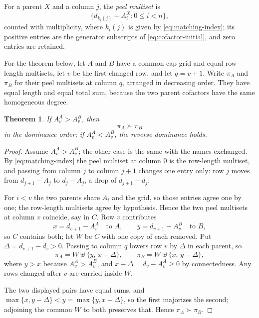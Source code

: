 \documentclass[11pt,a4paper]{amsart}
\numberwithin{equation}{section}
\theoremstyle{plain}
\newtheorem{theorem}{Theorem}[section]
\theoremstyle{definition}
\begin{document}
For a parent \(X\) and a column \(j\), the \emph{peel multiset} is
\[
\bigl\{d_{k_i(j)}-A_i^X:0\le i<n\bigr\},
\]
counted with multiplicity, where \(k_i(j)\) is given by \eqref{eq:matching-index}; its positive entries are the generator subscripts of \eqref{eq:cofactor-initial}, and zero entries are retained.

For the theorem below, let \(A\) and \(B\) have a common cap grid and equal row-length multisets, let \(v\) be the first changed row, and let \(q=v+1\).  Write \(\pi_A\) and \(\pi_B\) for their peel multisets at column \(q\), arranged in decreasing order.  They have equal length and equal total sum, because the two parent cofactors have the same homogeneous degree.

\begin{theorem}\label{thm:first-split-majorization}
If \(A_v^A>A_v^B\), then
\[
\pi_A\succ\pi_B
\]
in the dominance order; if \(A_v^A<A_v^B\), the reverse dominance holds.
\end{theorem}

\begin{proof}
Assume \(A_v^A>A_v^B\); the other case is the same with the names exchanged.  By \eqref{eq:matching-index} the peel multiset at column \(0\) is the row-length multiset, and passing from column \(j\) to column \(j+1\) changes one entry only: row \(j\) moves from \(d_{j+1}-A_j\) to \(d_j-A_j\), a drop of \(d_{j+1}-d_j\).

For \(i<v\) the two parents share \(A_i\) and the grid, so those entries agree one by one; the row-length multisets agree by hypothesis.  Hence the two peel multisets at column \(v\) coincide, say in \(C\).  Row \(v\) contributes
\[
x=d_{v+1}-A_v^A
\quad\text{to \(A\)},
\qquad
y=d_{v+1}-A_v^B
\quad\text{to \(B\)},
\]
so \(C\) contains both; let \(W\) be \(C\) with one copy of each removed.  Put \(\Delta=d_{v+1}-d_v>0\).  Passing to column \(q\) lowers row \(v\) by \(\Delta\) in each parent, so
\[
\pi_A=W\uplus\{y,\,x-\Delta\},
\qquad
\pi_B=W\uplus\{x,\,y-\Delta\},
\]
where \(y>x\) because \(A_v^A>A_v^B\), and \(x-\Delta=d_v-A_v^A\ge0\) by connectedness.  Any rows changed after \(v\) are carried inside \(W\).

The two displayed pairs have equal sums, and \(\max\{x,y-\Delta\}<y=\max\{y,x-\Delta\}\), so the first majorizes the second; adjoining the common \(W\) to both preserves that.  Hence \(\pi_A\succ\pi_B\).
\end{proof}
\end{document}
